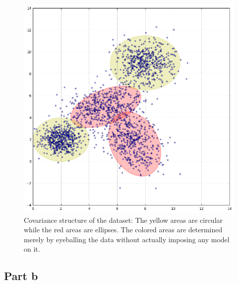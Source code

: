 \documentclass[12pt,twoside]{article}
\begin{document}
\begin{figure}[H]
	\begin{center}
		\includegraphics[width = 0.65\hsize]{./figures/CovarianceStructure.png} %
		\caption{Covariance structure of the dataset: The yellow areas are circular while the red areas are ellipses. The colored areas are determined merely by eyeballing the data without actually imposing any model 		on it.} %
		\label{fig:Covariance} %
	\end{center}
\end{figure}

\subsection{Part b}
\end{document}

